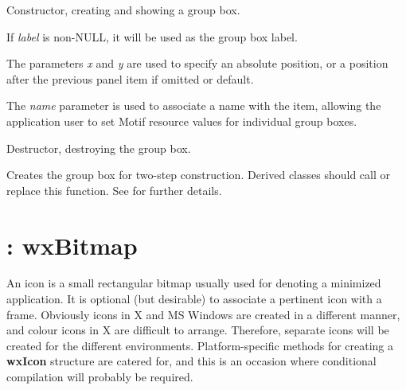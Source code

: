 
Constructor, creating and showing a group box.

If {\it label} is non-NULL, it will be used as the group box label.

The parameters {\it x} and {\it y} are used to specify an absolute
position, or a position after the previous panel item if omitted or
default.

The {\it name} parameter is used to associate a name with the item,
allowing the application user to set Motif resource values for
individual group boxes.



Destructor, destroying the group box.



Creates the group box for two-step construction. Derived classes
should call or replace this function. See \rtfsp
for further details.

\section{: wxBitmap}\label{wxicon}

An icon is a small rectangular bitmap usually used for denoting a
minimized application. It is optional (but desirable) to associate a
pertinent icon with a frame. Obviously icons in X and MS Windows are
created in a different manner, and colour icons in X are difficult
to arrange. Therefore, separate icons will be created for the different
environments.  Platform-specific methods for creating a {\bf wxIcon}\rtfsp
structure are catered for, and this is an occasion where conditional
compilation will probably be required.

